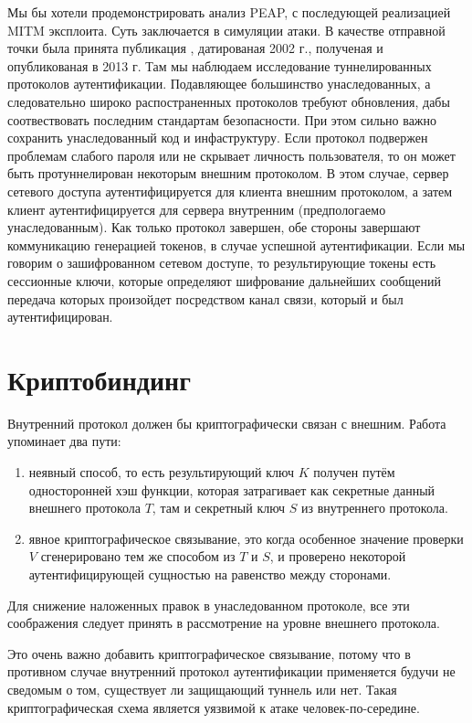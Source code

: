\documentclass[oneside, final, 14pt]{extarticle}
\begin{document}
Мы бы хотели продемонстрировать анализ PEAP,
с последующей реализацией MITM эксплоита.
Суть заключается в симуляции атаки.
В качестве отправной точки была принята публикация
\cite{tap2002},
датированая 2002 г., полученая и опубликованая в 2013 г.
Там мы наблюдаем исследование туннелированных протоколов
аутентификации.
Подавляющее большинство унаследованных, а следовательно
широко распостраненных протоколов
требуют обновления, дабы соотвествовать последним
стандартам безопасности.
При этом сильно важно сохранить унаследованный код
и инфаструктуру.
Если протокол подвержен проблемам слабого пароля
или не скрывает личность пользователя,
то он может быть протуннелирован некоторым внешним протоколом.
В этом случае, сервер сетевого доступа
аутентифицируется для клиента внешним протоколом,
а затем клиент аутентифицируется для сервера внутренним
(предпологаемо унаследованным).
Как только протокол завершен, обе стороны завершают коммуникацию
генерацией токенов,
в случае успешной аутентификации.
Если мы говорим о зашифрованном сетевом доступе,
то результирующие токены есть сессионные ключи,
которые определяют шифрование дальнейших сообщений
передача которых произойдет посредством
канал связи, который и был аутентифицирован.

\cleardoublepage

\section{Криптобиндинг}
Внутренний протокол должен бы криптографически связан
с внешним.
Работа \cite{tap2002} упоминает два пути:
\begin{enumerate}
  \item неявный способ, то есть результирующий ключ $K$ получен
    путём односторонней хэш функции, которая затрагивает как секретные
    данный внешнего протокола $T$,
    там и секретный ключ $S$ из внутреннего протокола.
  \item явное криптографическое связывание, это когда
    особенное значение проверки $V$
    сгенерировано тем же способом из $T$ и $S$,
    и проверено некоторой аутентифицирующей сущностью
    на равенство между сторонами.
\end{enumerate}

Для снижение наложенных правок в унаследованном протоколе,
все эти соображения следует принять в рассмотрение
на уровне внешнего протокола.

Это очень важно добавить криптографическое связывание,
потому что в противном случае внутренний протокол
аутентификации применяется будучи не сведомым о том,
существует ли защищающий туннель или нет.
Такая криптографическая схема является уязвимой к атаке
человек-по-середине.
\end{document}
